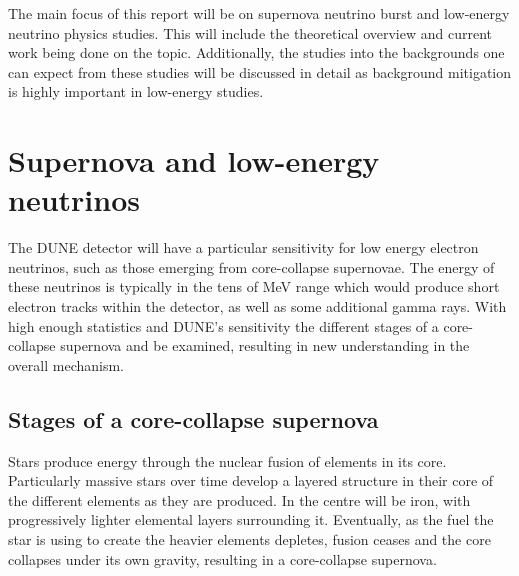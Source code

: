 \noindent The main focus of this report will be on supernova neutrino burst and low-energy neutrino physics studies. 
This will include the theoretical overview and current work being done on the topic.
Additionally, the studies into the backgrounds one can expect from these studies will be discussed in detail as background mitigation is highly important in low-energy studies.


\section{Supernova and low-energy neutrinos}
The DUNE detector will have a particular sensitivity for low energy electron neutrinos, such as those emerging from core-collapse supernovae.
The energy of these neutrinos is typically in the tens of MeV range which would produce short electron tracks within the detector, as well as some additional gamma rays.
With high enough statistics and DUNE's sensitivity the different stages of a core-collapse supernova and be examined, resulting in new understanding in the overall mechanism.

\subsection{Stages of a core-collapse supernova}
Stars produce energy through the nuclear fusion of elements in its core.
Particularly massive stars over time develop a layered structure in their core of the different elements as they are produced. 
In the centre will be iron, with progressively lighter elemental layers surrounding it. 
Eventually, as the fuel the star is using to create the heavier elements depletes, fusion ceases and the core collapses under its own gravity, resulting in a core-collapse supernova.

